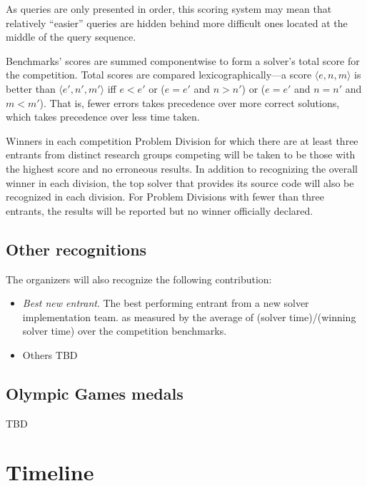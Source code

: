 \documentclass[12pt]{article}
\begin{document}
As queries are only presented in order, this scoring system may mean
that relatively ``easier'' queries are hidden behind more difficult
ones located at the middle of the query sequence.

Benchmarks' scores are summed componentwise to form a solver's total
score for the competition.
Total scores are compared lexicographically---a score $\langle e,n,m\rangle$ is better than 
$\langle e',n',m'\rangle$ iff $e < e'$ or ($e = e'$ and $n > n'$) or ($e = e'$ and $n = n'$ and $m < m'$).
That is, fewer errors takes precedence over more correct solutions, which takes precedence over less time taken.


Winners in each competition Problem Division for which there are at least three
entrants from distinct research groups competing will be taken to be
those with the highest score and no erroneous results. In addition to recognizing the overall
winner in each division, the top solver that provides its source code will also be
recognized in each division.  
For Problem Divisions with fewer than three
entrants, the results will be reported but no winner officially
declared.

\subsection{Other recognitions}
The organizers will also recognize the following contribution:
\begin{itemize}
\item {\em Best new entrant}. The best performing entrant from a new solver implementation team. as measured by the average of 
(solver time)/(winning solver time) over the competition benchmarks.
\item Others TBD
\end{itemize}

\subsection{Olympic Games medals}

TBD

\section{Timeline}
\label{sec:timeline}
\end{document}
